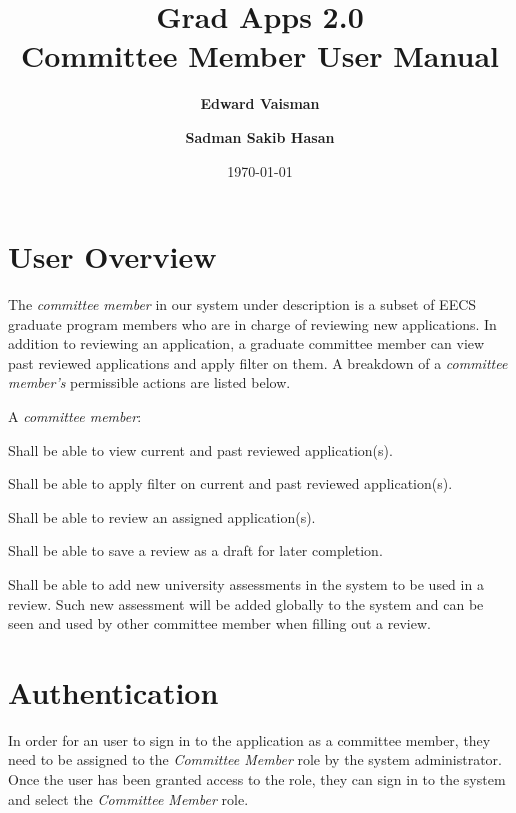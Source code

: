 \documentclass[fontsize=12pt,paper=letter,twoside]{scrartcl}
\author{\textbf{Edward Vaisman}
\and \textbf{Sadman Sakib Hasan}
}
\date{\today} %
\begin{document}
\title{Grad Apps 2.0 \\ Committee Member User Manual}
\maketitle

\newpage

\tableofcontents
\listoffigures
\listoftables

\newpage



\clearpage
\section{User Overview}

The \emph{committee member} in our system under description is a subset of EECS graduate program members who are in charge of reviewing new applications. In addition to reviewing an application, a graduate committee member can view past reviewed applications and apply filter on them. A breakdown of a \emph{committee member's} permissible actions are listed below.

\smallskip
\noindent A \emph{committee member}:

\begin{mylist}
\item Shall be able to view current and past reviewed application(s).
\item Shall be able to apply filter on current and past reviewed application(s).
\item Shall be able to review an assigned application(s).
\item Shall be able to save a review as a draft for later completion.
\item Shall be able to add new university assessments in the system to be used in a review. Such new assessment will be added globally to the system and can be seen and used by other committee member when filling out a review.
\end{mylist}

\section{Authentication}

In order for an user to sign in to the application as a committee member, they need to be assigned to the \emph{Committee Member} role by the system administrator. Once the user has been granted access to the role, they can sign in to the system and select the \emph{Committee Member} role.
\end{document}
